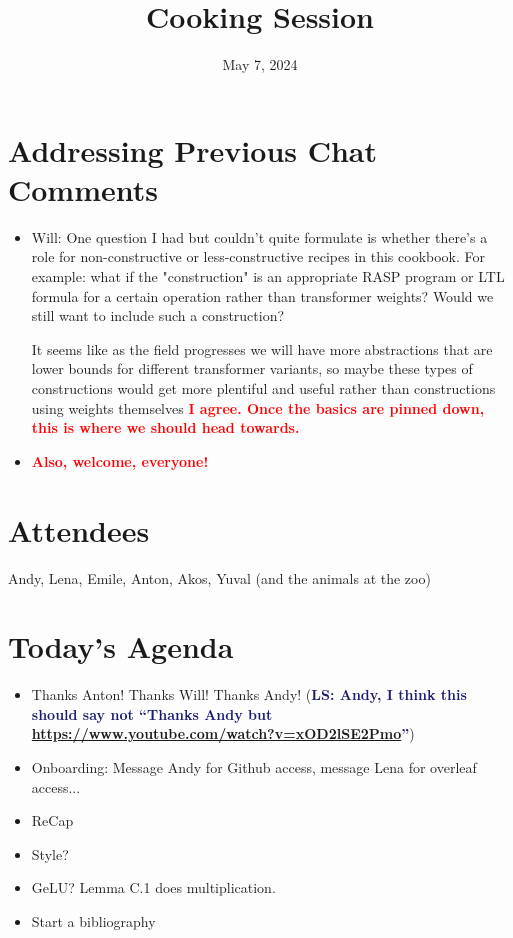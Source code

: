 \documentclass{article}
\title{Cooking Session}
\date{May 7, 2024}
\newcommand{\LS}[1]{({\textcolor{MidnightBlue}{\textbf{LS: #1}}})}
\newcommand{\response}[1]{{\textcolor{red}{\textbf{#1}}}}
\begin{document}
\maketitle
\section{Addressing Previous Chat Comments}
\begin{itemize}
   \item Will: 
    One question I had but couldn't quite formulate is whether there's a role for non-constructive or less-constructive recipes in this cookbook. For example: what if the "construction" is an appropriate RASP program or LTL formula for a certain operation rather than transformer weights? Would we still want to include such a construction?
    
    It seems like as the field progresses we will have more abstractions that are lower bounds for different transformer variants, so maybe these types of constructions would get more plentiful and useful rather than constructions using weights themselves \response{I agree. Once the basics are pinned down, this is where we should head towards.}
    \item \response{Also, welcome, everyone!}
\end{itemize}

\section{Attendees}
Andy, Lena, Emile, Anton, Akos, Yuval (and the animals at the zoo)

\section{Today's Agenda}
\begin{itemize}
    \item Thanks Anton! Thanks Will! Thanks Andy! \LS{Andy, I think this should say not ``Thanks Andy but \url{https://www.youtube.com/watch?v=xOD2lSE2Pmo}''}
    \item Onboarding: Message Andy for Github access, message Lena for overleaf access...
    \item ReCap
    \item Style?
    \item GeLU? \cite{feng2024towards} Lemma C.1 does multiplication.
    \item Start a bibliography
\end{itemize}
\end{document}

